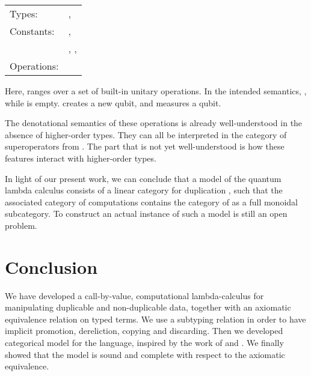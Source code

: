 \documentclass{llncs}
\begin{document}
\begin{center}
  \begin{tabular}{ll}
    Types: & ,  \\
    Constants: & , \\
    & , , \\
    Operations: & 
  \end{tabular}
\end{center}

Here,  ranges over a set of built-in unitary operations. In the
intended semantics, , while  is
empty.  creates a new qubit, and  measures a
qubit. 

The denotational semantics of these operations is already
well-understood in the absence of higher-order types. They can all be
interpreted in the category  of superoperators from
{\cite{selinger04quantum}}.  The part that is not yet well-understood
is how these features interact with higher-order types. 

In light of our present work, we can conclude that a model of the
quantum lambda calculus consists of a linear category for duplication
, such that the associated category of
computations  contains the category  of
{\cite{selinger04quantum}} as a full monoidal subcategory.  To
construct an actual instance of such a model is still an open problem.

\section{Conclusion}

We have developed a call-by-value, computational lambda-calculus for
manipulating duplicable and non-duplicable data, together with an
axiomatic equivalence relation on typed terms. We use a subtyping
relation in order to have implicit promotion, dereliction, copying and
discarding. 
Then we developed categorical model for the language, inspired by
the work of \cite{bierman93intuitionistic} and \cite{moggi91notions}.
We finally showed that the model is sound and complete with respect to
the axiomatic equivalence.
\end{document}

